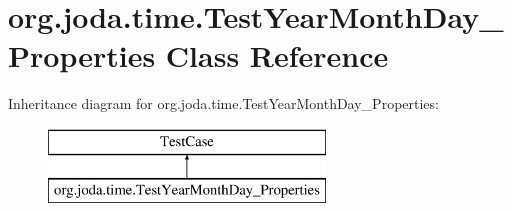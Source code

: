 \hypertarget{classorg_1_1joda_1_1time_1_1_test_year_month_day___properties}{\section{org.\-joda.\-time.\-Test\-Year\-Month\-Day\-\_\-\-Properties Class Reference}
\label{classorg_1_1joda_1_1time_1_1_test_year_month_day___properties}
}
Inheritance diagram for org.\-joda.\-time.\-Test\-Year\-Month\-Day\-\_\-\-Properties\-:\begin{figure}[H]
\begin{center}
\leavevmode
\includegraphics[height=2.000000cm]{classorg_1_1joda_1_1time_1_1_test_year_month_day___properties}
\end{center}
\end{figure}
